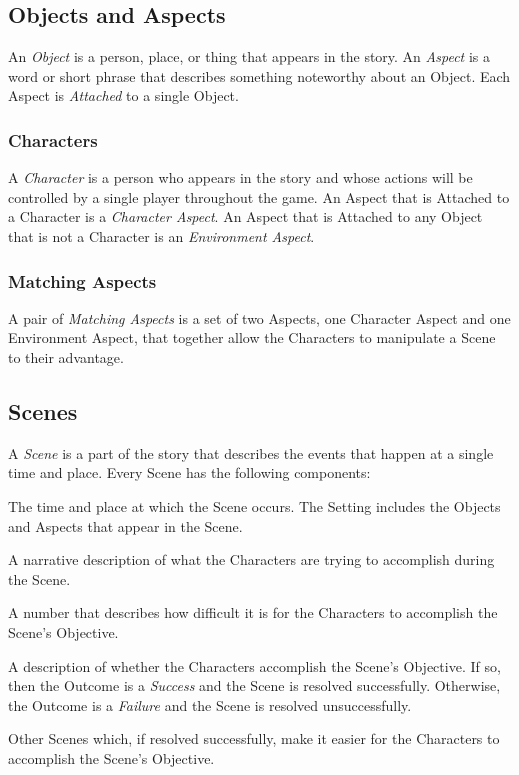 \documentclass[12pt, a5paper, parskip=half-]{scrartcl}
\begin{document}
\subsection*{Objects and Aspects}
An \emph{Object} is a person, place, or thing that appears in the story.
An \emph{Aspect} is a word or short phrase that describes something noteworthy about an Object.
Each Aspect is \emph{Attached} to a single Object.

\subsubsection*{Characters}
A \emph{Character} is a person who appears in the story and whose actions will be controlled by a single player throughout the game.  An Aspect that is Attached to a Character is a \emph{Character Aspect}.
An Aspect that is Attached to any Object that is not a Character is an \emph{Environment Aspect}.

\subsubsection*{Matching Aspects}
A pair of \emph{Matching Aspects} is a set of two Aspects, one Character Aspect and one Environment Aspect, that together allow the Characters to manipulate a Scene to their advantage.

\newpage

\subsection*{Scenes}
A \emph{Scene} is a part of the story that describes the events that happen at a single time and place.
Every Scene has the following components:
\begin{description}[leftmargin=0pt]
  \item[\emph{Setting}]
  The time and place at which the Scene occurs. The Setting includes the Objects and Aspects that appear in the Scene.
  \item[\emph{Objective}]
    A narrative description of what the Characters are trying to accomplish during the Scene.
  \item[\emph{Difficulty Rating}]
    A number that describes how difficult it is for the Characters to accomplish the Scene's Objective.
  \item[\emph{Outcome}]
    A description of whether the Characters accomplish the Scene's Objective. If so, then the Outcome is a \emph{Success} and the Scene is resolved successfully. Otherwise, the Outcome is a \emph{Failure} and the Scene is resolved unsuccessfully.
  \item[\emph{Precursors}]
    Other Scenes which, if resolved successfully, make it easier for the Characters to accomplish the Scene's Objective.
\end{description}
\end{document}
